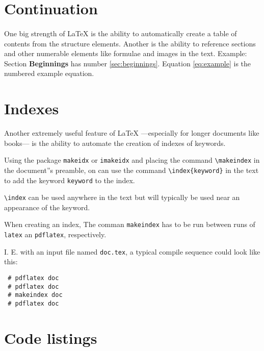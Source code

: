 \documentclass{article}
\begin{document}
\section{Continuation}

\paragraph{}One big strength of {\LaTeX} is the ability to automatically create a table of contents from the
structure elements. Another is the ability to reference  sections and other numerable elements like formulae
and images in the text. Example: Section \textbf{Beginnings} has number \ref{sec:beginnings}.
Equation \ref{eq:example} is the numbered example equation.


\section{Indexes}

Another extremely useful feature of  {\LaTeX} ---especially for longer documents like books--- is the ability to automate the creation of indexes of keywords.

Using the package \verb+makeidx+ or \verb+imakeidx+ and placing the  command  \verb+\makeindex+ in the document''s preamble, on can use the command \verb+\index{keyword}+ in the text to add the keyword  \texttt{keyword} to the index.

\verb+\index+ can be used anywhere in the text but will typically be used near an  appearance of the keyword.

When creating an index,  The comman \verb+makeindex+ has to be run between runs of \verb+latex+ an \verb+pdflatex+, respectively.

I. E. with an input file named \verb+doc.tex+, a typical compile sequence could look like this:



\begin{lstlisting}
 # pdflatex doc
 # pdflatex doc
 # makeindex doc
 # pdflatex doc
\end{lstlisting}


\section{Code listings}
\end{document}
